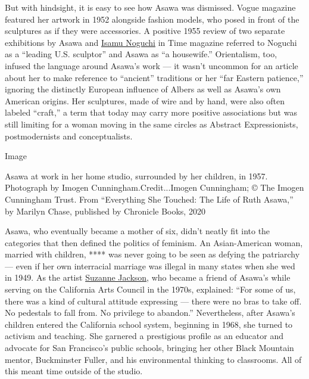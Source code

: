 But with hindsight, it is easy to see how Asawa was dismissed. Vogue
magazine featured her artwork in 1952 alongside fashion models, who
posed in front of the sculptures as if they were accessories. A positive
1955 review of two separate exhibitions by Asawa and
\href{https://www.nytimes3xbfgragh.onion/2020/02/25/arts/design/isamu-noguchi-midtown-installation.html}{Isamu
Noguchi} in Time magazine referred to Noguchi as a ``leading U.S.
sculptor'' and Asawa as ``a housewife.'' Orientalism, too, infused the
language around Asawa's work --- it wasn't uncommon for an article about
her to make reference to ``ancient'' traditions or her ``far Eastern
patience,'' ignoring the distinctly European influence of Albers as well
as Asawa's own American origins. Her sculptures, made of wire and by
hand, were also often labeled ``craft,'' a term that today may carry
more positive associations but was still limiting for a woman moving in
the same circles as Abstract Expressionists, postmodernists and
conceptualists.

Image

Asawa at work in her home studio, surrounded by her children, in 1957.
Photograph by Imogen Cunningham.Credit...Imogen Cunningham; © The Imogen
Cunningham Trust. From ``Everything She Touched: The Life of Ruth
Asawa,'' by Marilyn Chase, published by Chronicle Books, 2020

Asawa, who eventually became a mother of six, didn't neatly fit into the
categories that then defined the politics of feminism. An Asian-American
woman, married with children, **** was never going to be seen as defying
the patriarchy --- even if her own interracial marriage was illegal in
many states when she wed in 1949. As the artist
\href{https://www.nytimes3xbfgragh.onion/2019/11/19/t-magazine/suzanne-jackson-artist.html}{Suzanne
Jackson}, who became a friend of Asawa's while serving on the California
Arts Council in the 1970s, explained: ``For some of us, there was a kind
of cultural attitude expressing --- there were no bras to take off. No
pedestals to fall from. No privilege to abandon.'' Nevertheless, after
Asawa's children entered the California school system, beginning in
1968, she turned to activism and teaching. She garnered a prestigious
profile as an educator and advocate for San Francisco's public schools,
bringing her other Black Mountain mentor, Buckminster Fuller, and his
environmental thinking to classrooms. All of this meant time outside of
the studio.

